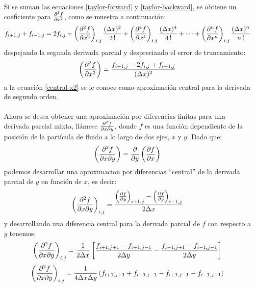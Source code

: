\documentclass[letterpaper, openright, 12pt]{book}
\begin{document}
    \paragraph*{}
    Si se suman las ecuaciones \ref{taylor-forward} y \ref{taylor-backward}, se
    obtiene un coeficiente para $\pdv[2]{f}{x}$, como se muestra a continuación:
    \begin{equation*}
    f_{i+1,j} + f_{i-1, j} = 2 f_{i,j} + \left( \pdv[2]{f}{x} \right)_{i,j} \frac{(\Delta x) ^2}{2\,!} + \left( \pdv[4]{f}{x} \right)_{i,j} \frac{(\Delta x)^4}{4\,!} + \dotsb + \left( \pdv[n]{f}{x} \right)_{i,j} \frac{(\Delta x)^n}{n\,!}
    \end{equation*}
    despejando la segunda derivada parcial y despreciando el error de truncamiento:
    \begin{equation}
    \left( \pdv[2]{f}{x} \right) = \frac{f_{i+1,j} - 2f_{i,j} + f_{i-1,j}}{(\Delta x)^2}
    \label{central-x2}
    \end{equation}
    a la ecuación \ref{central-x2} se le conoce como aproximación central para
    la derivada de segundo orden.

    \paragraph*{}
    Ahora se desea obtener una aproximación por diferencias finitas para una
    derivada parcial mixta, llámese $\pdv{f}{x}{y}$, donde $f$ es una función
    dependiente de la posición de la partícula de fluido a lo largo de dos ejes,
    $x$ y $y$. Dado que:
    \begin{equation}
    \left( \pdv{f}{x}{y} \right) = \pdv{y} \left( \pdv{f}{x} \right)
    \end{equation}
    podemos desarrollar una aproximacion por diferencias ``central'' de la
    derivada parcial de $y$ en función de $x$, es decir:
    \begin{equation}
    \left( \pdv{f}{x}{y} \right)_{i,j} = \frac{\left( \pdv{f}{y} \right)_{i+1, j} - \left( \pdv{f}{y} \right)_{i-1,j}}{2 \Delta x}
    \end{equation}
    y desarrollando una diferencia central para la derivada parcial de $f$ con
    respecto a $y$ tenemos:
    \begin{equation}
    \left( \pdv{f}{x}{y} \right)_{i,j} = \frac{1}{2 \Delta x} \left[ \frac{f_{i+1, j+1} - f_{i+1, j-1}}{2 \Delta y} - \frac{f_{i-1, j+1} - f_{i-1, j-1}}{2 \Delta y} \right]
    \end{equation}
    \begin{equation}
    \left( \pdv{f}{x}{y} \right)_{i,j} = \frac{1}{4 \Delta x \Delta y} \left( f_{i+1, j+1} + f_{i-1, j-1} - f_{i+1, j-1} - f_{i-1, j+1} \right)
    \end{equation}
\end{document}
